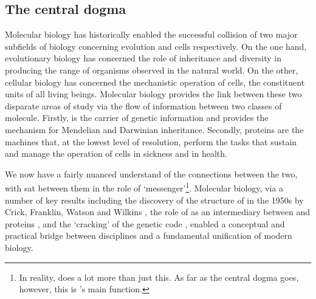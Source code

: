 \documentclass[thesis.tex]{subfiles}
\begin{document}
\subsection{The central dogma \label{sec:central_dogma}}
Molecular biology has historically enabled the successful collision of two major subfields of biology concerning evolution and cells respectively. On the one hand, evolutionary biology has concerned the role of inheritance and diversity in producing the range of organisms observed in the natural world. On the other, cellular biology has concerned the mechanistic operation of cells, the constituent units of all living beings. Molecular biology provides the link between these two disparate areas of study via the flow of information between two classes of molecule. Firstly,  is the carrier of genetic information and provides the mechanism for Mendelian and Darwinian inheritance. Secondly, proteins are the machines that, at the lowest level of resolution, perform the tasks that sustain and manage the operation of cells in sickness and in health. 

We now have a fairly nuanced understand of the connections between the two, with  sat between them in the role of `messenger'\footnote{In reality,  does a lot more than just this. As far as the central dogma goes, however, this is 's main function.}. Molecular biology, via a number of key results including the discovery of the structure of  in the 1950s by Crick, Franklin, Watson and Wilkins \citep{franklin_molecular_1953, watson_molecular_1953, wilkins_molecular_1953, maddox_double_2003}, the role of  as an intermediary between  and proteins \citep{boivin_sur_1947, crick_protein_1958, brenner_unstable_1961, cobb_who_2015}, and the `cracking' of the genetic code \citep{crick_general_1961, nirenberg_rna_1964, brenner_uga_1967, tamura_genetic_2016}, enabled a conceptual and practical bridge
between disciplines and a fundamental unification of modern biology. 
\end{document}
